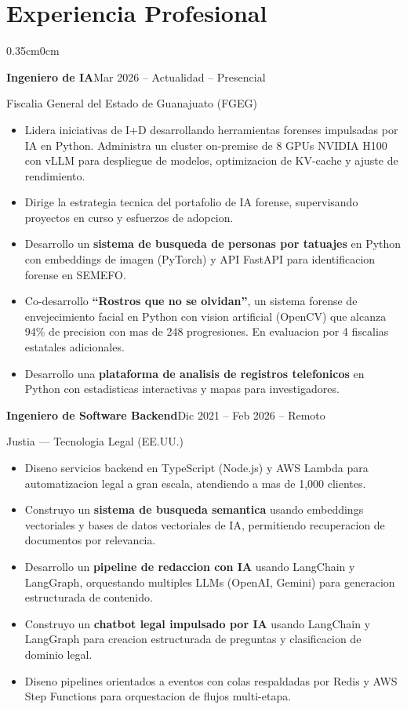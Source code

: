 \documentclass[a4paper, 10pt]{article}
\newenvironment{highlights}{
  \begin{itemize}[topsep=0.06cm,itemsep=0.05cm,parsep=0pt,leftmargin=0.6cm,label={\small\textbullet}]
    }{
  \end{itemize}
}
\newcommand{\entryheader}[2]{
  \par\noindent\textbf{#1}\hfill#2\par
}
\begin{document}
\section{Experiencia Profesional}
\begin{adjustwidth}{0.35cm}{0cm}
\entryheader{Ingeniero de IA}{Mar 2026 -- Actualidad -- Presencial}
Fiscalia General del Estado de Guanajuato (FGEG)

\begin{highlights}
\item Lidera iniciativas de I+D desarrollando herramientas forenses impulsadas por IA en Python. Administra un cluster on-premise de 8 GPUs NVIDIA H100 con vLLM para despliegue de modelos, optimizacion de KV-cache y ajuste de rendimiento.
\item Dirige la estrategia tecnica del portafolio de IA forense, supervisando proyectos en curso y esfuerzos de adopcion.
\item Desarrollo un \textbf{sistema de busqueda de personas por tatuajes} en Python con embeddings de imagen (PyTorch) y API FastAPI para identificacion forense en SEMEFO.
\item Co-desarrollo \textbf{``Rostros que no se olvidan''}, un sistema forense de envejecimiento facial en Python con vision artificial (OpenCV) que alcanza 94\% de precision con mas de 248 progresiones. En evaluacion por 4 fiscalias estatales adicionales.
\item Desarrollo una \textbf{plataforma de analisis de registros telefonicos} en Python con estadisticas interactivas y mapas para investigadores.
\end{highlights}

\vspace{0.12cm}

\entryheader{Ingeniero de Software Backend}{Dic 2021 -- Feb 2026 -- Remoto}
Justia --- Tecnologia Legal (EE.UU.)

\begin{highlights}
\item Diseno servicios backend en TypeScript (Node.js) y AWS Lambda para automatizacion legal a gran escala, atendiendo a mas de 1,000 clientes.
\item Construyo un \textbf{sistema de busqueda semantica} usando embeddings vectoriales y bases de datos vectoriales de IA, permitiendo recuperacion de documentos por relevancia.
\item Desarrollo un \textbf{pipeline de redaccion con IA} usando LangChain y LangGraph, orquestando multiples LLMs (OpenAI, Gemini) para generacion estructurada de contenido.
\item Construyo un \textbf{chatbot legal impulsado por IA} usando LangChain y LangGraph para creacion estructurada de preguntas y clasificacion de dominio legal.
\item Diseno pipelines orientados a eventos con colas respaldadas por Redis y AWS Step Functions para orquestacion de flujos multi-etapa.
\end{highlights}
\end{adjustwidth}
\end{document}

